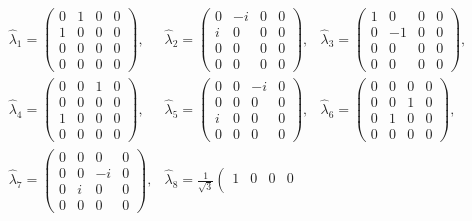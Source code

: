 \documentclass[10pt, letterpaper]{article}
\begin{document}
$$
\begin{array}{lll}
\hat{\lambda}_{1}=\left(\begin{array}{cccc}
0 & 1 & 0 & 0 \\
1 & 0 & 0 & 0 \\
0 & 0 & 0 & 0 \\
0 & 0 & 0 & 0
\end{array}\right), & \hat{\lambda}_{2}=\left(\begin{array}{cccc}
0 & -i & 0 & 0 \\
i & 0 & 0 & 0 \\
0 & 0 & 0 & 0 \\
0 & 0 & 0 & 0
\end{array}\right), & \hat{\lambda}_{3}=\left(\begin{array}{cccc}
1 & 0 & 0 & 0 \\
0 & -1 & 0 & 0 \\
0 & 0 & 0 & 0 \\
0 & 0 & 0 & 0
\end{array}\right), \\
\hat{\lambda}_{4}=\left(\begin{array}{llll}
0 & 0 & 1 & 0 \\
0 & 0 & 0 & 0 \\
1 & 0 & 0 & 0 \\
0 & 0 & 0 & 0
\end{array}\right), & \hat{\lambda}_{5}=\left(\begin{array}{cccc}
0 & 0 & -i & 0 \\
0 & 0 & 0 & 0 \\
i & 0 & 0 & 0 \\
0 & 0 & 0 & 0
\end{array}\right), & \hat{\lambda}_{6}=\left(\begin{array}{llll}
0 & 0 & 0 & 0 \\
0 & 0 & 1 & 0 \\
0 & 1 & 0 & 0 \\
0 & 0 & 0 & 0
\end{array}\right), \\
\hat{\lambda}_{7}=\left(\begin{array}{cccc}
0 & 0 & 0 & 0 \\
0 & 0 & -i & 0 \\
0 & i & 0 & 0 \\
0 & 0 & 0 & 0
\end{array}\right), & \hat{\lambda}_{8}=\frac{1}{\sqrt{3}}\left(\begin{array}{cccc}
1 & 0 & 0 & 0 \\

\end{array}
\end{array}$$
\end{document}
